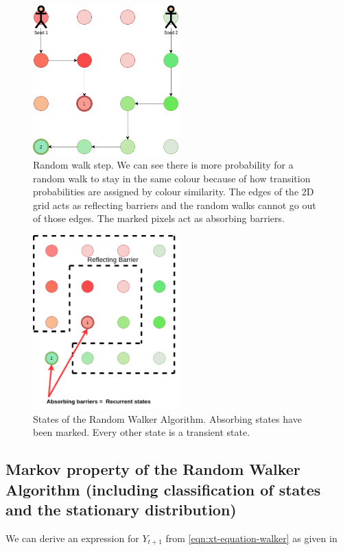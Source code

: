 \documentclass[a4paper]{article}
\begin{document}
\begin{figure}
    \centering
    \includegraphics[width=0.5\textwidth]{rw-3.png}
    \caption{Random walk step. We can see there is more probability for a random walk to stay in the same colour because of how transition probabilities are assigned by colour similarity. The edges of the 2D grid acts as reflecting barriers and the random walks cannot go out of those edges. The marked pixels act as absorbing barriers.}
    \label{fig:rw3}
\end{figure}

\begin{figure}
    \centering
    \includegraphics[width=0.5\textwidth]{rw-4.png}
    \caption{States of the Random Walker Algorithm. Absorbing states have been marked. Every other state is a transient state.}
    \label{fig:rw4}
\end{figure}
\FloatBarrier
\subsection{Markov property of the Random Walker Algorithm (including classification of states and the stationary distribution)}
We can derive an expression for $Y_{t+1}$ from \eqref{eqn:xt-equation-walker} as given in
\end{document}
